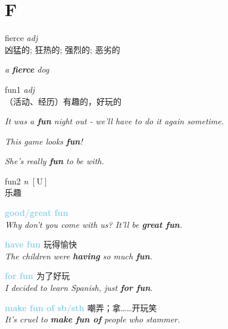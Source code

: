 \section{F}

\item[] {
    \lettrine{fierce}{}  
    \textit{adj} \\
    凶猛的; 狂热的; 强烈的; 恶劣的

    \textit{a \textbf{fierce} dog}
    
} 

\item[] {
    \lettrine{fun}{1}  
    \textit{adj} \\
    （活动、经历）有趣的，好玩的

    \textit{It was a \textbf{fun} night out - we'll have to do it again sometime.}

    \textit{This game looks \textbf{fun}!}

    \textit{She's really \textbf{fun} to be with.}
  
} 
\item[] {
    \lettrine{fun}{2}  
    \textit{n} 
    $\mathrm{[U]}$ \\
    乐趣

    \textbf {
        \textcolor{SkyBlue} {
            good/great fun
        }
    } \\
    \textit{Why don't you come with us? It'll be \textbf{great fun}.}

    \textbf {
        \textcolor{SkyBlue} {
            have fun
        }
    } 
    玩得愉快 \\
    \textit{The children were \textbf{having} so much \textbf{fun}.}

    \textbf {
        \textcolor{SkyBlue} {
            for fun
        }
    }  
    为了好玩 \\
    \textit{I decided to learn Spanish, just \textbf{for fun}.}
    
    \textbf {
        \textcolor{SkyBlue} {
            make \textprimstress fun of sb/sth
        }
    }  
    嘲弄；拿……开玩笑 \\
    \textit{It's cruel to \textbf{make fun of} people who stammer.}
} 
